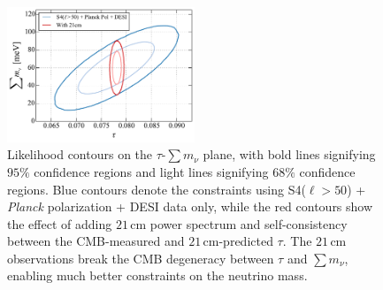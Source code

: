 \documentclass[twocolumn,aps,prd,nofootinbib,showpacs,superscriptaddress]{revtex4-1}
\begin{document}
\begin{figure}[!]
\centering
\includegraphics[width=0.5\textwidth]{figures/SumnuTau_w21cm.pdf}
\caption{Likelihood contours on the $\tau$-$\sum m_\nu$ plane, with bold lines signifying $95\%$ confidence regions and light lines signifying $68\%$ confidence regions. Blue contours denote the constraints using S4($\ell > 50$) + \emph{Planck} polarization + DESI data only, while the red contours show the effect of adding $21\,\textrm{cm}$ power spectrum and self-consistency between the CMB-measured and $21\,\textrm{cm}$-predicted $\tau$. The $21\,\textrm{cm}$ observations break the CMB degeneracy between $\tau$ and $\sum m_\nu$, enabling much better constraints on the neutrino mass.}
\label{fig:SumnuTau_w21cm}
\end{figure}
\end{document}
